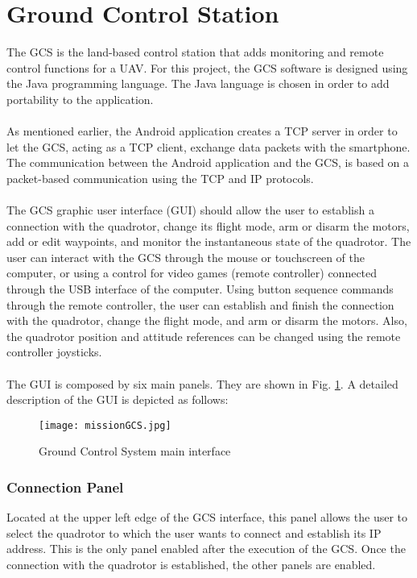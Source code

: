 \section{Ground Control Station}\label{sec:gcs}
The GCS is the land-based control station that adds monitoring and remote control functions for a UAV. For this project, the GCS software is designed using the Java programming language. The Java language is chosen in order to add portability to the application.
\\\\
As mentioned earlier, the Android application creates a TCP server in order to let the GCS, acting as a TCP client, exchange data packets with the smartphone. The communication between the Android application and the GCS, is based on a packet-based communication using the TCP and IP protocols. 
\\\\
The GCS graphic user interface (GUI) should allow the user to establish a connection with the quadrotor, change its flight mode, arm or disarm the motors, add or edit waypoints, and monitor the instantaneous state of the quadrotor. The user can interact with the GCS through the mouse or touchscreen of the computer, or using a control for video games (remote controller) connected through the USB interface of the computer. Using button sequence commands through the remote controller, the user can establish and finish the connection with the quadrotor, change the flight mode, and arm or disarm the motors. Also, the quadrotor position and attitude references can be changed using the remote controller joysticks.
\\\\
The GUI is composed by six main panels. They are shown in Fig. \ref{fig:missionGCS}. A detailed description of the GUI is depicted as follows:
\begin{figure}[h]
\begin{center}
\texttt{[image: missionGCS.jpg]}  
\caption{Ground Control System main interface} 
\label{fig:missionGCS}
\end{center}
\end{figure}

\subsubsection*{Connection Panel}
Located at the upper left edge of the GCS interface, this panel allows the user to select the quadrotor to which the user wants to connect and establish its IP address. This is the only panel enabled after the execution of the GCS. Once the connection with the quadrotor is established, the other panels are enabled.
